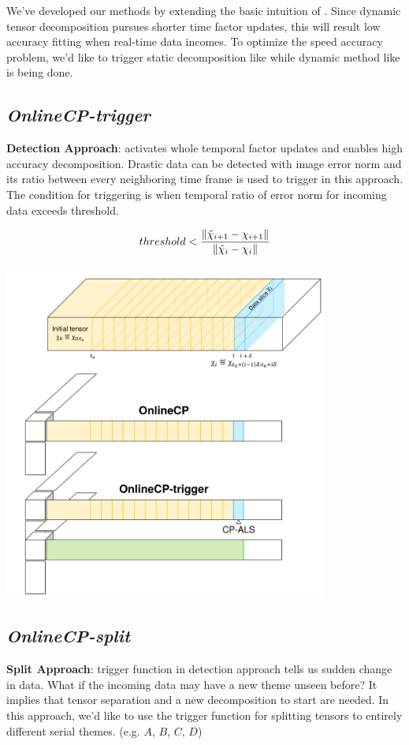 
We've developed our methods by extending the basic intuition of \ocp. Since dynamic tensor decomposition pursues shorter time factor updates, this will result low accuracy fitting when real-time data incomes. To optimize the speed accuracy problem, we'd like to trigger static decomposition like \cpals while dynamic method like \ocp is being done.

\subsection{\em OnlineCP-trigger}
\textbf{Detection Approach}: \cpals activates whole temporal factor updates and enables high accuracy decomposition. Drastic data can be detected with image error norm and its ratio between every neighboring time frame is used to trigger \cpals in this approach. The condition for triggering is when temporal ratio of error norm for incoming data exceeds threshold.

\begin{align*}
    threshold < \frac{\left\lVert\tilde{\chi}_{i+1}-\chi_{i+1}\right\rVert}{\left\lVert\tilde{\chi}_{i}-\chi_{i}\right\rVert}
\end{align*}

\begin{center}
	\includegraphics[width=0.8\textwidth]{FIG/OnlineCP-trigger.png}
\end{center}

\newpage
\subsection{\em OnlineCP-split}
\textbf{Split Approach}: trigger function in detection approach tells us sudden change in data. What if the incoming data may have a new theme unseen before? It implies that tensor separation and a new decomposition to start are needed. In this approach, we'd like to use the trigger function for splitting tensors to entirely different serial themes. (e.g. $A$, $B$, $C$, $D$)

